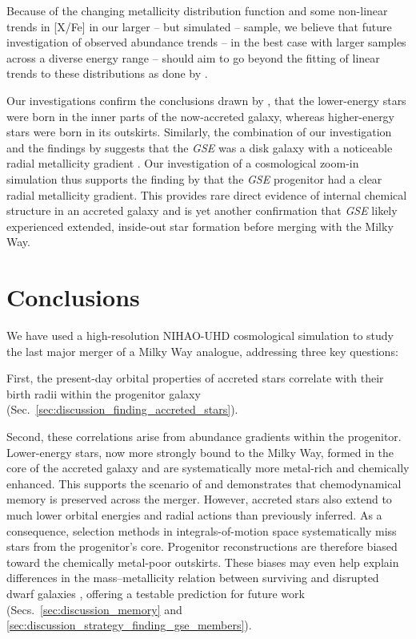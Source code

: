 \documentclass[fleqn,usenatbib]{mnras}
\begin{document}
Because of the changing metallicity distribution function and some non-linear trends in [X/Fe] in our larger -- but simulated -- sample, we believe that future investigation of observed abundance trends -- in the best case with larger samples across a diverse energy range -- should aim to go beyond the fitting of linear trends to these distributions as done by \citet{Skuladottir2025}.

Our investigations confirm the conclusions drawn by \citet{Skuladottir2025}, that the lower-energy stars were born in the inner parts of the now-accreted galaxy, whereas higher-energy stars were born in its outskirts. Similarly, the combination of our investigation and the findings by \citet{Skuladottir2025} suggests that the \textit{GSE} was a disk galaxy with a noticeable radial metallicity gradient%
. Our investigation of a cosmological zoom-in simulation thus supports the finding by \citet{Skuladottir2025} that the \textit{GSE} progenitor had a clear radial metallicity gradient. This provides rare direct evidence of internal chemical structure in an accreted galaxy and is yet another confirmation that \textit{GSE} likely experienced extended, inside-out star formation before merging with the Milky Way.

\section{Conclusions}
\label{sec:conclusions}

We have used a high-resolution NIHAO-UHD cosmological simulation to study the last major merger of a Milky Way analogue, addressing three key questions:

First, the present-day orbital properties of accreted stars correlate with their birth radii within the progenitor galaxy (Sec.~\ref{sec:discussion_finding_accreted_stars}).

Second, these correlations arise from abundance gradients within the progenitor. Lower-energy stars, now more strongly bound to the Milky Way, formed in the core of the accreted galaxy and are systematically more metal-rich and chemically enhanced. This supports the scenario of \citet{Skuladottir2025} and demonstrates that chemodynamical memory is preserved across the merger. However, accreted stars also extend to much lower orbital energies and radial actions than previously inferred. As a consequence, selection methods in integrals-of-motion space \citep{Helmi2018, Feuillet2021, Monty2024} systematically miss stars from the progenitor’s core. Progenitor reconstructions are therefore biased toward the chemically metal-poor outskirts. These biases may even help explain differences in the mass–metallicity relation between surviving and disrupted dwarf galaxies \citep{Naidu2022}, offering a testable prediction for future work (Secs.~\ref{sec:discussion_memory} and \ref{sec:discussion_strategy_finding_gse_members}).
\end{document}
